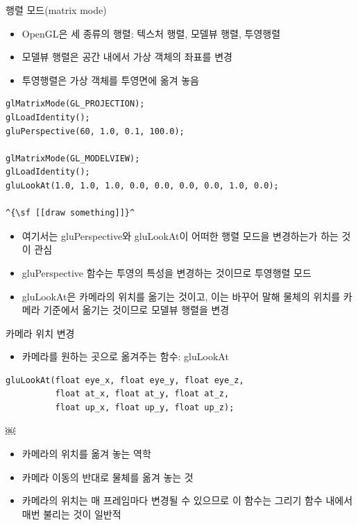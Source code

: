 \documentclass{beamer}
\begin{document}
\begin{frame}[fragile]{행렬 모드(matrix mode)}

{\small
\begin{itemize}
\item OpenGL은 세 종류의 행렬: 텍스처 행렬, 모델뷰 행렬, 투영행렬
\item 모델뷰 행렬은 공간 내에서 가상 객체의 좌표를 변경
\item 투영행렬은 가상 객체를 투영면에 옮겨 놓음
\end{itemize}

\lstset{language=C++, escapechar=^} 
\begin{lstlisting}
glMatrixMode(GL_PROJECTION);
glLoadIdentity();
gluPerspective(60, 1.0, 0.1, 100.0);

glMatrixMode(GL_MODELVIEW);
glLoadIdentity();
gluLookAt(1.0, 1.0, 1.0, 0.0, 0.0, 0.0, 0.0, 1.0, 0.0);

^{\sf [[draw something]]}^
\end{lstlisting}

\begin{itemize}
\item 여기서는 {\sf gluPerspective}와 {\sf gluLookAt}이 어떠한 행렬 모드을 변경하는가 하는 것이 관심
\item {\sf gluPerspective} 함수는 투영의 특성을 변경하는 것이므로 투영행렬 모드
\item {\sf gluLookAt}은 카메라의 위치를 옮기는 것이고, 이는 바꾸어 말해 물체의 위치를 카메라 기준에서 옮기는 것이므로 모델뷰 행렬을 변경
\end{itemize}
}

\end{frame}

\begin{frame}[fragile]{카메라 위치 변경}

\begin{itemize}
\item 카메라를 원하는 곳으로 옮겨주는 함수:  {\sf gluLookAt}
\end{itemize}


\begin{verbatim}
gluLookAt(float eye_x, float eye_y, float eye_z,
          float at_x, float at_y, float at_z,
          float up_x, float up_y, float up_z);
\end{verbatim}

￼
\begin{itemize}
\item 카메라의 위치를 옮겨 놓는 역학
\item 카메라 이동의 반대로 물체를 옮겨 놓는 것
\item 카메라의 위치는 매 프레임마다 변경될 수 있으므로 이 함수는 그리기 함수 내에서 매번 불리는 것이 일반적
\end{itemize}

\end{frame}
\end{document}
